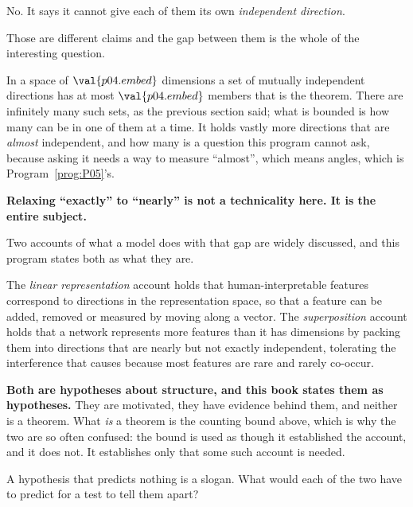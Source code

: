 \begin{fr}
\begin{ansblock}
No. It says it cannot give each of them its own \emph{independent direction}.
\end{ansblock}

Those are different claims and the gap between them is the whole of the
interesting question.

In a space of $\val{p04.embed}$ dimensions a set of mutually independent
directions has at most $\val{p04.embed}$ members \dash{} that is the theorem.
There are infinitely many such sets, as the previous section said; what is
bounded is how many can be in one of them at a time.
It holds vastly more directions that are \emph{almost} independent, and how
many is a question this program cannot ask, because asking it needs a way to
measure \enquote{almost}, which means angles, which is
Program~\ref{prog:P05}'s.

\textbf{Relaxing \enquote{exactly} to \enquote{nearly} is not a technicality
here. It is the entire subject.}
\end{fr}

\begin{fr}
Two accounts of what a model does with that gap are widely discussed, and this
program states both as what they are.

The \emph{linear representation} account holds that human-interpretable
features correspond to directions in the representation space, so that a
feature can be added, removed or measured by moving along a vector. The
\emph{superposition} account holds that a network represents more features than
it has dimensions by packing them into directions that are nearly but not
exactly independent, tolerating the interference that causes because most
features are rare and rarely co-occur.

\begin{warning}
\textbf{Both are hypotheses about structure, and this book states them as
hypotheses.} They are motivated, they have evidence behind them, and neither is
a theorem. What \emph{is} a theorem is the counting bound above, which is why
the two are so often confused: the bound is used as though it established the
account, and it does not. It establishes only that some such account is needed.
\end{warning}

A hypothesis that predicts nothing is a slogan. What would each of the two have
to predict for a test to tell them apart?
\nextframe
\end{fr}

